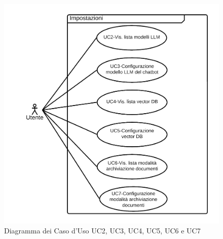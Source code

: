 \documentclass[10pt, a4paper]{article}
\begin{document}
    \begin{figure}[h]
        \centering
        \includegraphics[width=\textwidth, height=\textheight, keepaspectratio]{UC-images/UC2-UC3-UC4-UC5-UC6-UC7.png}
        \caption{Diagramma dei Caso d'Uso UC2, UC3, UC4, UC5, UC6 e UC7}
    \end{figure}
\end{document}
